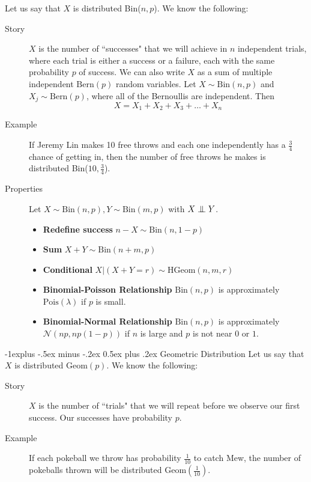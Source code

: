 \documentclass[10pt,landscape]{article}
\makeatletter
\newcommand\independent{\protect\mathpalette{\protect\independenT}{\perp}}
\def\independenT#1#2{\mathrel{\setbox0\hbox{$#1#2$}%
    \copy0\kern-\wd0\mkern4mu\box0}}
\newcommand{\N}{\mathcal{N}}
\newcommand{\Bern}{\textrm{Bern}}
\newcommand{\Bin}{\textrm{Bin}}
\newcommand{\Pois}{\textrm{Pois}}
\newcommand{\Geom}{\textrm{Geom}}
\newcommand{\HGeom}{\textrm{HGeom}}
\renewcommand{\subsection}{\@startsection{subsection}{2}{0mm}%
                                {-1explus -.5ex minus -.2ex}%
                                {0.5ex plus .2ex}%
                                {\normalfont\normalsize\bfseries}}
\makeatother
\begin{document}
\begin{multicols*}{3}
Let us say that $X$ is distributed \Bin($n,p$). We know the following:
\begin{description}
    \item[Story] $X$ is the number of ``successes" that we will achieve in $n$ independent trials, where each trial is either a success or a failure, each with the same probability $p$ of success. We can also write $X$ as a sum of multiple independent $\Bern(p)$ random variables. Let $X \sim \Bin(n, p)$ and $X_j \sim \Bern(p)$, where all of the Bernoullis are independent. Then
        \[X = X_1 + X_2 + X_3 + \dots + X_n\]
    \item[Example] If Jeremy Lin makes 10 free throws and each one independently has a $\frac{3}{4}$ chance of getting in, then the number of free throws he makes is distributed  \Bin($10,\frac{3}{4}$).
\item[Properties] Let $X \sim \Bin(n,p), Y \sim \Bin(m,p)$ with $X \independent Y$.
\begin{itemize}
\item \textbf{Redefine success} $n-X \sim \Bin(n,1-p)$
\item \textbf{Sum} $X+Y \sim \Bin(n+m,p)$
\item \textbf{Conditional} $X|(X+Y=r) \sim \HGeom(n,m,r)$
 \item \textbf{Binomial-Poisson Relationship} $\Bin(n, p)$ is approximately  $\Pois(\lambda)$ if $p$ is small.
   \item \textbf{Binomial-Normal Relationship} $\Bin(n, p)$ is approximately $\N(np,np(1-p))$ if $n$ is large and $p$ is not near $0$ or $1$.
  \end{itemize}
\end{description}

\subsection{Geometric Distribution} Let us say that $X$ is distributed $\Geom(p)$. We know the following:
\begin{description}
    \item[Story] $X$ is the number of ``trials" that we will repeat before we observe our first success. Our successes have probability $p$.
    \item[Example] If each pokeball we throw has probability  $\frac{1}{10}$ to catch Mew, the number of pokeballs thrown will be distributed $\Geom(\frac{1}{10})$.
\end{description}


\end{multicols*}
\end{document}
